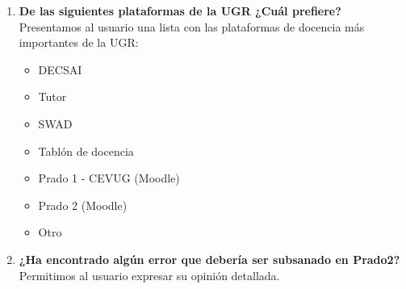\begin{enumerate}

  \item \textbf{De las siguientes plataformas de la UGR ¿Cuál prefiere?} Presentamos al usuario una lista con las plataformas de docencia más importantes de la UGR:

  		\begin{itemize}
  			\item DECSAI
            \item Tutor
            \item SWAD
            \item Tablón de docencia
            \item Prado 1 - CEVUG (Moodle)
            \item Prado 2 (Moodle)
            \item Otro
		\end{itemize}


  \item \textbf{¿Ha encontrado algún error que debería ser subsanado en Prado2?} Permitimos al usuario expresar su opinión detallada.


\end{enumerate}
